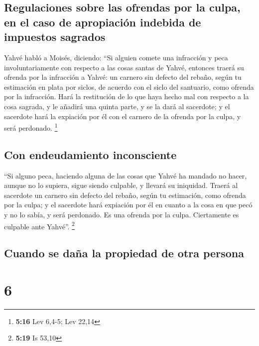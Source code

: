 \hypertarget{regulaciones-sobre-las-ofrendas-por-la-culpa-en-el-caso-de-apropiaciuxf3n-indebida-de-impuestos-sagrados}{%
\subsection{Regulaciones sobre las ofrendas por la culpa, en el caso de
apropiación indebida de impuestos
sagrados}\label{regulaciones-sobre-las-ofrendas-por-la-culpa-en-el-caso-de-apropiaciuxf3n-indebida-de-impuestos-sagrados}}

 Yahvé habló a Moisés, diciendo:  ``Si
alguien comete una infracción y peca involuntariamente con respecto a
las cosas santas de Yahvé, entonces traerá su ofrenda por la infracción
a Yahvé: un carnero sin defecto del rebaño, según tu estimación en plata
por siclos, de acuerdo con el siclo del santuario, como ofrenda por la
infracción.  Hará la restitución de lo que haya hecho mal
con respecto a la cosa sagrada, y le añadirá una quinta parte, y se la
dará al sacerdote; y el sacerdote hará la expiación por él con el
carnero de la ofrenda por la culpa, y será perdonado. \footnote{\textbf{5:16}
  Lev 6,4-5; Lev 22,14}

\hypertarget{con-endeudamiento-inconsciente}{%
\subsection{Con endeudamiento
inconsciente}\label{con-endeudamiento-inconsciente}}

 ``Si alguno peca, haciendo alguna de las cosas que Yahvé
ha mandado no hacer, aunque no lo supiera, sigue siendo culpable, y
llevará su iniquidad.  Traerá al sacerdote un carnero sin
defecto del rebaño, según tu estimación, como ofrenda por la culpa; y el
sacerdote hará expiación por él en cuanto a la cosa en que pecó y no lo
sabía, y será perdonado.  Es una ofrenda por la culpa.
Ciertamente es culpable ante Yahvé''. \footnote{\textbf{5:19} Is 53,10}

\hypertarget{cuando-se-dauxf1a-la-propiedad-de-otra-persona}{%
\subsection{Cuando se daña la propiedad de otra
persona}\label{cuando-se-dauxf1a-la-propiedad-de-otra-persona}}

\hypertarget{section-5}{%
\section{6}\label{section-5}}


